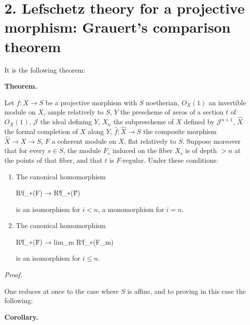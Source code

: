 \documentclass[
  11pt,
  a4paper,
]{book}
\newenvironment{Shaded}{}{}
\newcommand{\NormalTok}[1]{#1}
\begin{document}
\section{2. Lefschetz theory for a projective morphism: Grauert's
comparison
theorem}\label{lefschetz-theory-for-a-projective-morphism-grauerts-comparison-theorem}

It is the following theorem:

\textbf{Theorem.}

Let \(f: X \to S\) be a projective morphism with \(S\) noetherian,
\(O_{X}(1)\) an invertible module on \(X\), ample relatively to \(S\),
\(Y\) the prescheme of zeros of a section \(t\) of \(O_{X}(1)\),
\(\mathcal{J}\) the ideal defining \(Y\), \(X_{n}\) the subprescheme of
\(X\) defined by \(\mathcal{J}^{n+1}\), \(\hat{X}\) the formal
completion of \(X\) along \(Y\), \(\hat{f}: \hat{X}
\to S\) the composite morphism \(\hat{X} \to X \to S\), \(F\) a coherent
module on \(X\), flat relatively to \(S\). Suppose moreover that for
every \(s \in S\), the module \(F_{s}\) induced on the fiber \(X_{s}\)
is of depth \(> n\) at the points of that fiber, and that \(t\) is
\(F\)-regular. Under these conditions:

\begin{enumerate}
\def\labelenumi{\arabic{enumi}.}
\item
  The canonical homomorphism

\begin{Shaded}
\begin{Highlighting}[]
\NormalTok{Rⁱf\_∗(F) → Rⁱf̂\_∗(F̂)}
\end{Highlighting}
\end{Shaded}

  is an isomorphism for \(i < n\), a monomorphism for \(i = n\).
\item
  The canonical homomorphism

\begin{Shaded}
\begin{Highlighting}[]
\NormalTok{Rⁱf̂\_∗(F̂) → lim\_m Rⁱf\_∗(F\_m)}
\end{Highlighting}
\end{Shaded}

  is an isomorphism for \(i \leqslant n\).
\end{enumerate}

\emph{Proof.}

One reduces at once to the case where \(S\) is affine, and to proving in
this case the following:

\textbf{Corollary.}
\end{document}
